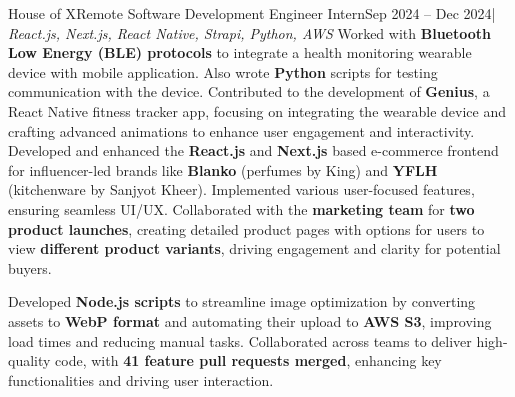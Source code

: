 \resumeSubheading
  {House of X}{Remote}
  {Software Development Engineer Intern}{Sep 2024 -- Dec 2024}{| \textit{React.js, Next.js, React Native, Strapi, Python, AWS}}
  \resumeItemListStart
    {Worked with \textbf{Bluetooth Low Energy (BLE) protocols} to integrate a health monitoring wearable device with mobile application. Also wrote \textbf{Python} scripts for testing communication with the device.}
    {Contributed to the development of \textbf{Genius}, a React Native fitness tracker app, focusing on integrating the wearable device and  crafting advanced animations to enhance user engagement and interactivity.}
    {Developed and enhanced the \textbf{React.js} and \textbf{Next.js} based e-commerce frontend for influencer-led brands like \textbf{Blanko} (perfumes by King) and \textbf{YFLH} (kitchenware by Sanjyot Kheer). Implemented various user-focused features, ensuring seamless UI/UX.}
    {Collaborated with the \textbf{marketing team} for \textbf{two product launches}, creating detailed product pages with options for users to view \textbf{different product variants}, driving engagement and clarity for potential buyers.}

    {Developed \textbf{Node.js scripts} to streamline image optimization by converting assets to \textbf{WebP format} and automating their upload to \textbf{AWS S3}, improving load times and reducing manual tasks.}
    {Collaborated across teams to deliver high-quality code, with \textbf{41 feature pull requests merged}, enhancing key functionalities and driving user interaction.}
  \resumeItemListEnd
